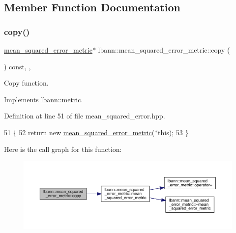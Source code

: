 \subsection{Member Function Documentation}
\mbox{\label{classlbann_1_1mean__squared__error__metric_a4caa0dfc86361a1c9a91fb64efecfcc9}} 
\subsubsection{\texorpdfstring{copy()}{copy()}}
{\footnotesize\ttfamily \hyperlink{classlbann_1_1mean__squared__error__metric}{mean\+\_\+squared\+\_\+error\+\_\+metric}$\ast$ lbann\+::mean\+\_\+squared\+\_\+error\+\_\+metric\+::copy (\begin{DoxyParamCaption}{ }\end{DoxyParamCaption}) const\hspace{0.3cm}{\ttfamily [inline]}, {\ttfamily [override]}, {\ttfamily [virtual]}}

Copy function. 

Implements \hyperlink{classlbann_1_1metric_a2a4498d41f77da8585552f485caab167}{lbann\+::metric}.



Definition at line 51 of file mean\+\_\+squared\+\_\+error.\+hpp.


\begin{DoxyCode}
51                                                    \{
52     \textcolor{keywordflow}{return} \textcolor{keyword}{new} \hyperlink{classlbann_1_1mean__squared__error__metric_ae8a430d4cb0b350606839ea7b9eda69d}{mean\_squared\_error\_metric}(*\textcolor{keyword}{this});
53   \}
\end{DoxyCode}
Here is the call graph for this function\+:\nopagebreak
\begin{figure}[H]
\begin{center}
\leavevmode
\includegraphics[width=350pt]{classlbann_1_1mean__squared__error__metric_a4caa0dfc86361a1c9a91fb64efecfcc9_cgraph}
\end{center}
\end{figure}
\mbox{\label{classlbann_1_1mean__squared__error__metric_a81a2aa469f965d526a489214b3e73e4f}} 
